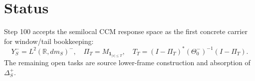 \documentclass[11pt]{article}
\newcommand{\R}{\mathbb R}
\newcommand{\one}{\mathbf 1}
\begin{document}
\section{Status}
Step 100 accepts the semilocal CCM response space as the first concrete carrier for window/tail bookkeeping:
\[
  Y_S^-=L^2(\R,dm_S)^-,\quad \Pi_T=M_{\one_{|s|\le T}},\quad T_T=(I-\Pi_T)^*(\Theta_0^-)^{-1}(I-\Pi_T).
\]
The remaining open tasks are source lower-frame construction and absorption of $\Delta_S^+$.
\end{document}
